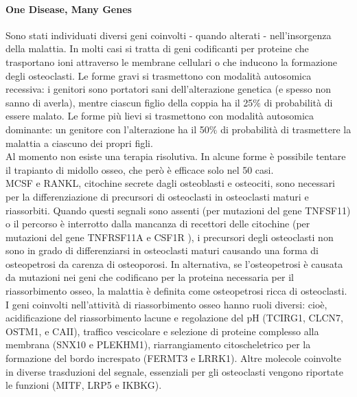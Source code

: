 \documentclass{article}
\begin{document}
\paragraph{One Disease, Many Genes}Sono stati individuati diversi geni coinvolti - quando alterati - nell'insorgenza della malattia. In
molti casi si tratta di geni codificanti per proteine che trasportano ioni attraverso le membrane
cellulari o che inducono la formazione degli osteoclasti. Le forme gravi si trasmettono con
modalità autosomica recessiva: i genitori sono portatori sani dell'alterazione genetica (e spesso
non sanno di averla), mentre ciascun figlio della coppia ha il 25$\%$ di probabilità di essere malato. Le
forme più lievi si trasmettono con modalità autosomica dominante: un genitore con l'alterazione
ha il 50$\%$ di probabilità di trasmettere la malattia a ciascuno dei propri figli.\\
Al momento non esiste una terapia risolutiva. In alcune forme è possibile
tentare il trapianto di midollo osseo, che però è efficace solo nel 50%
casi.\\
MCSF e RANKL, citochine secrete dagli osteoblasti e
osteociti, sono necessari per la differenziazione di
precursori di osteoclasti in osteoclasti maturi e riassorbiti. Quando questi segnali sono assenti (per mutazioni del gene TNFSF11) o il percorso è interrotto dalla mancanza di
recettori delle citochine (per mutazioni del gene TNFRSF11A e CSF1R
), i precursori degli osteoclasti non sono in grado di
differenziarsi in osteoclasti maturi causando
una forma di osteopetrosi da carenza di osteoporosi. In alternativa, se l'osteopetrosi
è causata da mutazioni nei geni che codificano per la proteina
necessaria per il riassorbimento osseo, la malattia è definita come
osteopetrosi ricca di osteoclasti. I geni coinvolti nell'attività di riassorbimento osseo
hanno ruoli diversi: cioè, acidificazione del riassorbimento
lacune e regolazione del pH (TCIRG1, CLCN7, OSTM1,
e CAII), traffico vescicolare e selezione di proteine
complesso alla membrana (SNX10 e PLEKHM1),
riarrangiamento citoscheletrico per la formazione del bordo increspato
(FERMT3 e LRRK1). Altre molecole coinvolte in
diverse trasduzioni del segnale, essenziali per gli osteoclasti
vengono riportate le funzioni (MITF, LRP5 e IKBKG).
\end{document}
